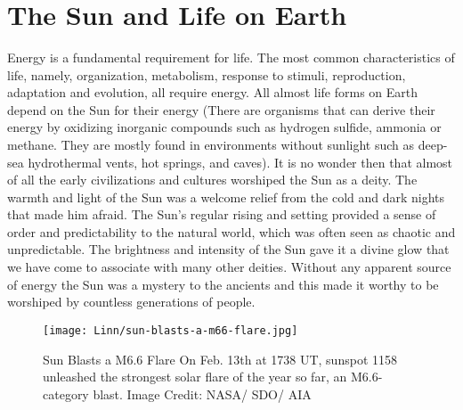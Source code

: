 \documentclass{../template/texnote}
\title{\textbf{\capitalisewords{Exploring the Explosive Side of the Sun}}}
\begin{document}
    \maketitle {}


\section{The Sun and Life on Earth}
Energy is a fundamental requirement for life. The most common characteristics of life, namely, organization, metabolism, response to stimuli, reproduction, adaptation and evolution, all require energy. All almost life forms on Earth depend on the Sun for their energy (There are organisms that can derive their energy by oxidizing inorganic compounds such as hydrogen sulfide, ammonia or methane. They are mostly found in environments without sunlight such as deep-sea hydrothermal vents, hot springs, and caves). It is no wonder then that almost of all the early civilizations and cultures worshiped the Sun as a deity. The warmth and light of the Sun was a welcome relief from the cold and dark nights that made him afraid. The Sun's regular rising and setting provided a sense of order and predictability to the natural world, which was often seen as chaotic and unpredictable. The brightness and intensity of the Sun gave it a divine glow that we have come to associate with many other deities. Without any apparent source of energy the Sun was a mystery to the ancients and this made it worthy to be worshiped by countless generations of people.

\begin{figure}
    \centering
    \texttt{[image: Linn/sun-blasts-a-m66-flare.jpg]}
    \caption{Sun Blasts a M6.6 Flare
On Feb. 13th at 1738 UT, sunspot 1158 unleashed the strongest solar flare of the year so far, an M6.6-category blast. Image Credit:  NASA/ SDO/ AIA}
    \label{fig:sun}
\end{figure}
\end{document}
